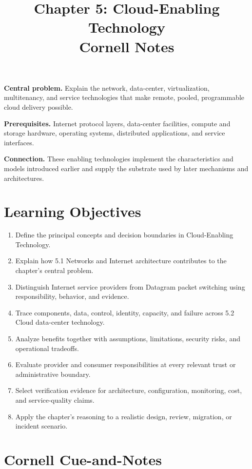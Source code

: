 \documentclass[11pt]{article}
\title{Chapter 5: Cloud-Enabling Technology\\[2mm]\large Cornell Notes}
\author{}
\date{}
\begin{document}
\maketitle
\thispagestyle{fancy}
\vspace{-1.5em}
\begin{orientationbox}
\textbf{Central problem.} Explain the network, data-center, virtualization, multitenancy, and service technologies that make remote, pooled, programmable cloud delivery possible.\par\smallskip
\textbf{Prerequisites.} Internet protocol layers, data-center facilities, compute and storage hardware, operating systems, distributed applications, and service interfaces.\par\smallskip
\textbf{Connection.} These enabling technologies implement the characteristics and models introduced earlier and supply the substrate used by later mechanisms and architectures.
\end{orientationbox}
\section{Learning Objectives}
\begin{enumerate}
\item Define the principal concepts and decision boundaries in Cloud-Enabling Technology.
\item Explain how 5.1 Networks and Internet architecture contributes to the chapter's central problem.
\item Distinguish Internet service providers from Datagram packet switching using responsibility, behavior, and evidence.
\item Trace components, data, control, identity, capacity, and failure across 5.2 Cloud data-center technology.
\item Analyze benefits together with assumptions, limitations, security risks, and operational tradeoffs.
\item Evaluate provider and consumer responsibilities at every relevant trust or administrative boundary.
\item Select verification evidence for architecture, configuration, monitoring, cost, and service-quality claims.
\item Apply the chapter's reasoning to a realistic design, review, migration, or incident scenario.
\end{enumerate}
\section{Cornell Cue-and-Notes}
\end{document}
